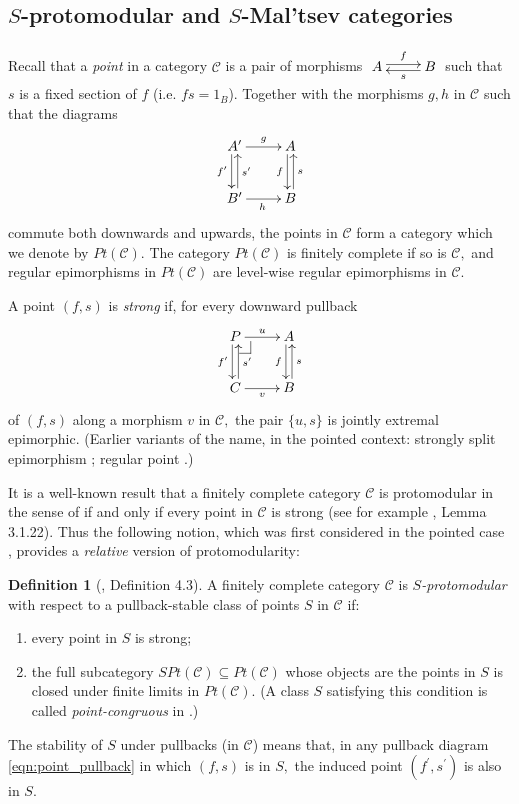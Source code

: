 \documentclass[11pt]{amsart}
\makeatletter
\theoremstyle{plain}
\theoremstyle{definition}
\newtheorem{definition}[subsubsection]{Definition}
\theoremstyle{remark}
\newcommand{\pullback}[4]{{#1 \leftindex_{#2}{\times}_{#3} #4}}
\def\pullback{%
 \ar@{-}[]+R+<4pt,-3pt>;[]+RD+<4pt,-6pt>%
 \ar@{-}[]+D+<3pt,-6pt>;[]+RD+<4pt,-6pt>}
\def\pullback{%
 \ar@{-}[]+R+<4pt,-3pt>;[]+RD+<4pt,-6pt>%
 \ar@{-}[]+D+<3pt,-6pt>;[]+RD+<4pt,-6pt>}
\makeatother
\begin{document}
\subsection{$S$-protomodular and $S$-Mal'tsev categories}
Recall that a \emph{point} in a category $\mathcal{C}$ is a pair of morphisms $\xymatrix{A \ar@<.5ex>[r]^-f &B \ar@<.5ex>[l]^-s }$ such that $s$ is a fixed section of $f$ (i.e. $fs=1_B$). Together with the morphisms $g,h$ in $\mathcal{C}$ such that the diagrams
\[
\xymatrix{
{A^\prime} \ar[r]^-g \ar@<-.5ex>[d]_-{f^\prime} &A \ar@<-.5ex>[d]_-f \\
{B^\prime} \ar[r]_h \ar@<-.5ex>[u]_-{s^\prime} &B \ar@<-.5ex>[u]_-s
}
\]
commute both downwards and upwards, the points in $\mathcal{C}$ form a category which we denote by $Pt(\mathcal{C}).$ The category $Pt(\mathcal{C})$ is finitely complete if so is $\mathcal{C},$ and regular epimorphisms in $Pt(\mathcal{C})$ are level-wise regular epimorphisms in $\mathcal{C}.$

A point $(f,s)$ is \emph{strong} \cite{S-protomodular} if, for every downward pullback
\begin{equation}
\begin{aligned}
\label{eqn:point_pullback}
\xymatrix{
P \pullback \ar[r]^-u \ar@<-.5ex>[d]_-{f^\prime} &A \ar@<-.5ex>[d]_-f \\
C \ar[r]_v \ar@<-.5ex>[u]_-{s^\prime} &B \ar@<-.5ex>[u]_-s
}
\end{aligned}
\end{equation}
of $(f,s)$ along a morphism $v$ in $\mathcal{C},$ the pair $\{u,s\}$ is jointly extremal epimorphic. (Earlier variants of the name, in the pointed context: strongly split epimorphism \cite{bourn-monad}; regular point \cite{MMS14}.)

It is a well-known result that a finitely complete category $\mathcal{C}$ is protomodular in the sense of \cite{bourn-proto} if and only if every point in $\mathcal{C}$ is strong (see for example \cite{borceux-bourn}, Lemma 3.1.22). Thus the following notion, which was first considered in the pointed case \cite{schreier_book, S-protomodular}, provides a \emph{relative} version of protomodularity:
\begin{definition}[\cite{mal'tsev-reflection}, Definition 4.3]
A finitely complete category $\mathcal{C}$ is $S$\emph{-protomodular} with respect to a pullback-stable class of points $S$ in $\mathcal{C}$ if:
\begin{enumerate}
\item every point in $S$ is strong;
\item the full subcategory $SPt(\mathcal{C})\subseteq Pt(\mathcal{C})$ whose objects are the points in $S$ is closed under finite limits in $Pt(\mathcal{C}).$ (A class $S$ satisfying this condition is called \emph{point-congruous} in \cite{mal'tsev-reflection, partial, 3x3}.)
\end{enumerate}
\end{definition}
The stability of $S$ under pullbacks (in $\mathcal{C}$) means that, in any pullback diagram \eqref{eqn:point_pullback} in which $(f,s)$ is in $S,$ the induced point $(f^\prime,s^\prime)$ is also in $S.$
\end{document}

